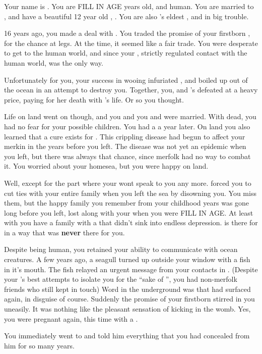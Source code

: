 \documentclass[char]{NeptuneBall}
\begin{document}
\name{\cAriel{}}


Your name is \cAriel{}. You are FILL IN AGE years old, and human. You are married to \cEric{}, and have a beautiful 12 year old \cWillow{\offspring}, \cWillow{}. You are also \pAtlantis{}'s eldest \cAriel{\prince}, and in big trouble.

16 years ago, you made a deal with \cWitch{}. You traded the promise of your firstborn \cArielsSon{\offspring}, for the chance at legs. At the time, it seemed like a fair trade. You were desperate to get to the human world, and since your \cKing{\parent}, \cKing{\King} \cKing{} strictly regulated contact with the human world, \cWitch{} was the only way.

Unfortunately for you, your success in wooing \cEric{} infuriated \cWitch{}, and \cWitch{\they} boiled up out of the ocean in an attempt to destroy you. Together, you, \cEric{} and \cEric{}'s \cPrince{\sibling} \cPrince{} defeated \cWitch{\them} at a heavy price, paying for her death with \cPrince{}'s life. Or so you thought.

Life on land went on though, and you and you and \cEric{} were married. With \cWitch{} dead, you had no fear for your possible children. You had a \cWillow{\offspring} a year later. On land you also learned that a cure exists for \cPolio{}. This crippling disease had begun to affect your merkin in the years before you left. The disease was not yet an epidemic when you left, but there was always that chance, since merfolk had no way to combat it. You worried about your homesea, but you were happy on land.

Well, except for the part where your \cKing{\parent} wont speak to you any more. \cKing{\They} forced you to cut ties with your entire family when you left the sea by disowning you. You miss them, but the happy family you remember from your childhood years was gone long before you left, lost along with your \cAthena{\parent} when you were FILL IN AGE. At least with \cEric{} you have a family with a \cEric{\parent} that didn't sink into endless depression. \cEric{} is there for \cWillow{} in a way that \cKing{} was {\bf never} there for you.

Despite being human, you retained your ability to communicate with ocean creatures. A few years ago, a seagull turned up outside your window with a fish in it's mouth. The fish relayed an urgent message from your contacts in \pAtlantis{}. (Despite your \cKing{\parent}'s best attempts to isolate you for the ``sake of \pAtlantis{}'', you had non-merfolk friends who still kept in touch) Word in the underground was that \cWitch{} had surfaced again, in disguise of course.  Suddenly the promise of your firstborn \cArielsSon{\offspring} stirred in you uneasily. It was nothing like the pleasant sensation of \cArielsSon{} kicking in the womb. Yes, you were pregnant again, this time with a \cArielsSon{\offspring}.

You immediately went to \cEric{} and told him everything that you had concealed from him for so many years.
\end{document}
